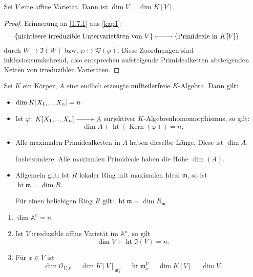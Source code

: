 \documentclass[a4paper,12pt,index=toc]{scrbook}
\theoremstyle{keinenummern} %
\def\A{\mathbb{A}}
\def\V{\mathfrak{V}}
\def\I{\mathfrak{I}}
\def\O{\mathcal{O}}
\def\m{\mathfrak{m}}
\newcommand{\Kern}{\operatorname{Kern}}
\newcommand{\hoehe}{\operatorname{ht}}
\renewcommand{\phi}{\varphi}
\renewcommand{\dotsc}{\ensuremath{\!...}}
\newcommand{\polyx}[1][n]{\ensuremath%
  [X_{1},\dotsc,X_{#1}]}
\begin{document}
\begin{prop}\label{3.2.4}
Sei $V$ eine affine Varietät. Dann ist $\dim V=\dim K[V]$. 
\end{prop}
\begin{proof}
Erinnerung an \cref{1.7.1} aus \cref{kap1}:
\begin{equation*}\displaystyle \{\text{nichtleere irreduzible Untervarietäten von }V\} \lra \{\text{Primideale in }K[V]\}\end{equation*}
durch $W\mapsto \I(W)$ bzw. $\wp \mapsto \V(\wp)$. Diese Zuordnungen sind inklusionsumkehrend, also entsprechen aufsteigende Primidealketten absteigenden Ketten von irreduziblen Varietäten.
\end{proof}

\begin{erinnerung}\label{3.2.5}
Sei $K$ ein Körper, $A$ eine endlich erzeugte nullteilerfreie $K$-Algebra. Dann gilt:
\begin{itemize}[leftmargin=*,labelindent=\parindent]
  \item $\dim K\polyx=n$
  \item Ist $\phi \colon K\polyx \surj A$ surjektiver $K$-Algebrenhomomorphismus, so gilt: \begin{equation*}\dim A+ \hoehe(\Kern(\phi))=n.\end{equation*}
  \item Alle maximalen Primidealketten in $A$ haben dieselbe Länge. Diese ist $\dim A$. 

Insbesondere: Alle maximalen Primideale haben die Höhe $\dim(A)$.
  \item Allgemein gilt: Ist $R$ lokaler Ring mit maximalen Ideal $\m$, so ist $\hoehe\m=\dim R$.

Für einen beliebigen Ring $R$ gilt: $\hoehe\m=\dim R_\m$.
\end{itemize}
\end{erinnerung}

\begin{kor}\label{3.2.6}
\begin{enumerate}
  \item $\dim \A^n=n$
  \item Ist $V$ irreduzible affine Varietät im $\A^n$, so gilt 
\begin{equation*}\dim V+\hoehe \I(V)=n.\end{equation*}
  \item Für $x \in V$ ist
\begin{equation*}\dim \O_{V,x}=\dim K[V]_{\m_x^V}=\hoehe\m_x^V=\dim K[V]=\dim V.\end{equation*}
\end{enumerate}
\end{kor}
\end{document}

